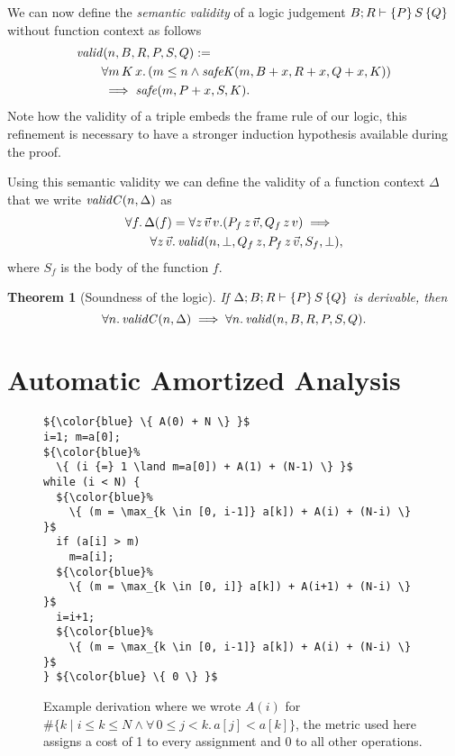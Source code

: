 \documentclass[nocopyrightspace,preprint]{sigplanconf}
\newtheorem{theorem}{Theorem}
\begin{document}
We can now define the \emph{semantic validity} of a logic judgement
$B; R \vdash \{P\}\, S\, \{Q\}$ without function context as follows
\begin{align*}
&\mathit{valid}(n,B,R,P,S,Q) := \\
&\qquad \forall m \, K \, x .\, (m \le n \land \mathit{safeK}(m,B+x,R+x,Q+x,K)) \\
&\qquad \implies \mathit{safe}(m,P+x,S,K).
\end{align*}
Note how the validity of a triple embeds the frame rule of
our logic, this refinement is necessary to have a stronger
induction hypothesis available during the proof.

Using this semantic validity  we can define the validity of
a function context $\Delta$ that we write $\mathit{validC}(n,\Delta)$ as
\begin{align*}
  &\forall f .\, \Delta(f) =
    \forall z \, \vec v \, v .(P_f \, z \, \vec v, Q_f \, z \, v)
    \implies \\
  &\qquad \forall z \, \vec v .\,
  \mathit{valid}(n,\bot,Q_f \, z,P_f \, z \, \vec v,S_f,\bot) ,
\end{align*}
where $S_f$ is the body of the function $f$.

\begin{theorem}[Soundness of the logic]
  If $\Delta; B; R \vdash \{P\}\, S\, \{Q\}$ is derivable, then
  $$
    \forall n .\, \mathit{validC}(n,\Delta)
      \implies \forall n .\, \mathit{valid}(n,B,R,P,S,Q).
  $$
\end{theorem}

\section{Automatic Amortized Analysis}

\begin{figure}
\begin{lstlisting}
${\color{blue} \{ A(0) + N \} }$
i=1; m=a[0];
${\color{blue}%
  \{ (i {=} 1 \land m=a[0]) + A(1) + (N-1) \} }$
while (i < N) {
  ${\color{blue}%
    \{ (m = \max_{k \in [0, i-1]} a[k]) + A(i) + (N-i) \} }$
  if (a[i] > m)
    m=a[i];
  ${\color{blue}%
    \{ (m = \max_{k \in [0, i]} a[k]) + A(i+1) + (N-i) \} }$
  i=i+1;
  ${\color{blue}%
    \{ (m = \max_{k \in [0, i-1]} a[k]) + A(i) + (N-i) \} }$
} ${\color{blue} \{ 0 \} }$
\end{lstlisting}
\caption{Example derivation where we wrote $A(i)$
  for $\#\{ k \mid i \le k \le N \land \forall\, 0\le j<k.\, a[j] < a[k]\}$,
  the metric used here assigns a cost of 1 to every assignment
  and 0 to all other operations.
  }
\label{fig:xmplmax}
\end{figure}
\end{document}
